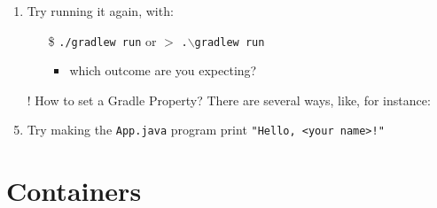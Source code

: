 \documentclass[handout]{beamer}\mode<presentation>{\usetheme{AMSCesenaBleu}}
\begin{document}
\begin{frame}[allowframebreaks]
\begin{enumerate}
        \item Try running it again, with:
        \begin{itemize}
            \item[\$] \texttt{./gradlew run} or \alert{$>$} \texttt{.$\backslash$gradlew run}
            \begin{itemize}
                \item which outcome are you expecting?
            \end{itemize}
        \end{itemize}
    \end{enumerate}
    \begin{itemize}
        \item[!] How to set a Gradle Property? There are several ways, like, for instance:
    \end{itemize}
    
    \begin{enumerate}\setcounter{enumi}{4}
        \item Try making the \texttt{App.java} program print \texttt{"Hello, <your name>!"}
    \end{enumerate}
    
\end{frame}

\section{Containers}
\end{document}
